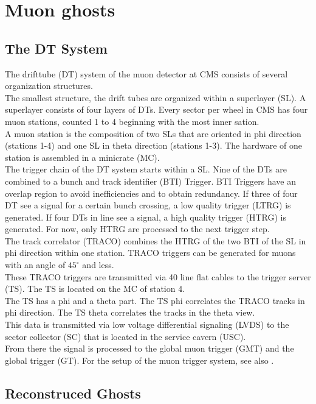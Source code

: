 \section{Muon ghosts}
\subsection{The DT System}
\label{DTSystem}
The drifttube (DT) system of the muon detector at CMS consists of several organization structures.\\
The smallest structure, the drift tubes are organized within a superlayer (SL). A superlayer consists of four layers of DTs. Every sector per wheel in CMS has four muon stations, counted 1 to 4 beginning with the most inner sation.\\
A muon station is the composition of two SLs that are oriented in phi direction (stations 1-4) and one SL in theta direction (stations 1-3). The hardware of one station is assembled in a minicrate (MC).\\
The trigger chain of the DT system starts within a SL. Nine of the DTs are combined to a bunch and track identifier (BTI) Trigger. BTI Triggers have an overlap region to avoid inefficiencies and to obtain redundancy. If three of four DT see a signal for a certain bunch crossing, a low quality trigger (LTRG) is generated. If four DTs in line see a signal, a high quality trigger (HTRG) is generated. For now, only HTRG are processed to the next trigger step.\\
The track correlator (TRACO) combines the HTRG of the two BTI of the SL in phi direction within one station. TRACO triggers can be generated for muons with an angle of $45^{\circ}$ \cite{bunchedBeamTest} and less.\\
These TRACO triggers are transmitted via 40 line flat cables to the trigger server (TS). The TS is located on the MC of station 4.\\
The TS has a phi and a theta part. The TS phi correlates the TRACO tracks in phi direction. The TS theta correlates the tracks in the theta view.\\
This data is transmitted via low voltage differential signaling (LVDS) to the sector collector (SC) that is located in the service cavern (USC).\\
From there the signal is processed to the global muon trigger (GMT) and the global trigger (GT).
For the setup of the muon trigger system, see also \cite{cmsMuonProject}.
\subsection{Reconstruced Ghosts}
